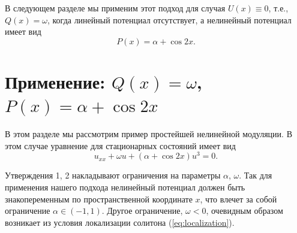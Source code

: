 В следующем разделе мы применим этот подход для случая $U(x) \equiv 0$, т.е., $Q(x) = \omega$, когда линейный потенциал отсутствует, а нелинейный потенциал имеет вид
$$P(x) = \alpha + \cos 2x.$$

\section{Применение: $Q(x) = \omega$, $P(x) = \alpha + \cos 2x$}

В этом разделе мы рассмотрим пример простейшей нелинейной модуляции.
В этом случае уравнение для стационарных состояний имеет вид
%
\begin{equation}
u_{xx} + \omega u + (\alpha + \cos 2x) u^3 = 0.
\label{eq:stationary_obj}
\end{equation}
%

Утверждения 1, 2 накладывают ограничения на параметры $\alpha$, $\omega$.
Так для применения нашего подхода нелинейный потенциал должен быть знакопеременным по пространственной координате $x$, что влечет за собой ограничение $\alpha \in (-1, 1)$.
Другое ограничение, $\omega < 0$, очевидным образом возникает из условия локализации солитона (\ref{eq:localization}).

